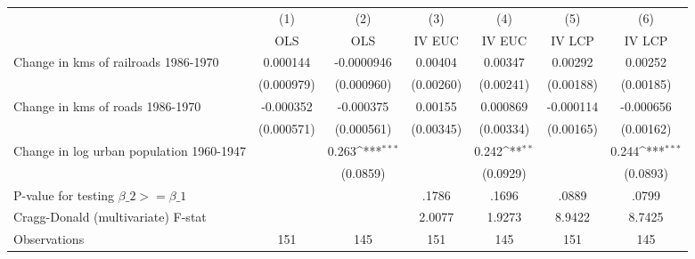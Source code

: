{
\def\sym#1{\ifmmode^{#1}\else\(^{#1}\)\fi}
\begin{tabular}{l*{6}{c}}
\hline\hline
                &\multicolumn{1}{c}{(1)}&\multicolumn{1}{c}{(2)}&\multicolumn{1}{c}{(3)}&\multicolumn{1}{c}{(4)}&\multicolumn{1}{c}{(5)}&\multicolumn{1}{c}{(6)}\\
                &\multicolumn{1}{c}{OLS}&\multicolumn{1}{c}{OLS}&\multicolumn{1}{c}{IV EUC}&\multicolumn{1}{c}{IV EUC}&\multicolumn{1}{c}{IV LCP}&\multicolumn{1}{c}{IV LCP}\\
\hline
Change in kms of railroads 1986-1970& 0.000144         &-0.0000946         &  0.00404         &  0.00347         &  0.00292         &  0.00252         \\
                &(0.000979)         &(0.000960)         &(0.00260)         &(0.00241)         &(0.00188)         &(0.00185)         \\
[1em]
Change in kms of roads 1986-1970&-0.000352         &-0.000375         &  0.00155         & 0.000869         &-0.000114         &-0.000656         \\
                &(0.000571)         &(0.000561)         &(0.00345)         &(0.00334)         &(0.00165)         &(0.00162)         \\
[1em]
Change in log urban population 1960-1947&                  &    0.263\sym{***}&                  &    0.242\sym{**} &                  &    0.244\sym{***}\\
                &                  & (0.0859)         &                  & (0.0929)         &                  & (0.0893)         \\
\hline
P-value for testing $\beta\_{2} >= \beta\_{1}$&                  &                  &    .1786         &    .1696         &    .0889         &    .0799         \\
Cragg-Donald (multivariate) F-stat&                  &                  &   2.0077         &   1.9273         &   8.9422         &   8.7425         \\
Observations    &      151         &      145         &      151         &      145         &      151         &      145         \\
\hline\hline
\end{tabular}
}
